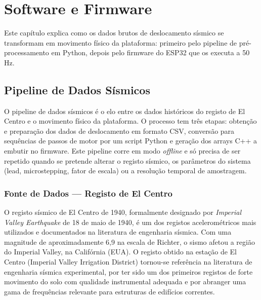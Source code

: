 

\chapter{Software e Firmware}
\label{chapter:software}

\begin{introduction}
Este capítulo explica como os dados brutos de deslocamento sísmico se transformam em movimento físico da plataforma: primeiro pelo pipeline de pré-processamento em Python, depois pelo firmware do ESP32 que os executa a 50\,Hz.
\end{introduction}



\section{Pipeline de Dados Sísmicos}
\label{sec:pipeline-dados}

O pipeline de dados sísmicos é o elo entre os dados históricos do registo de El Centro e o movimento físico da plataforma. O processo tem três etapas: obtenção e preparação dos dados de deslocamento em formato CSV, conversão para sequências de passos de motor por um script Python e geração dos arrays C++ a embutir no firmware. Este pipeline corre em modo \textit{offline} e só precisa de ser repetido quando se pretende alterar o registo sísmico, os parâmetros do sistema (lead, microstepping, fator de escala) ou a resolução temporal de amostragem.


\subsection{Fonte de Dados --- Registo de El Centro}
\label{subsec:fonte-dados}

O registo sísmico de El Centro de 1940, formalmente designado por \textit{Imperial Valley Earthquake} de 18 de maio de 1940, é um dos registos acelerométricos mais utilizados e documentados na literatura de engenharia sísmica. Com uma magnitude de aproximadamente 6,9 na escala de Richter, o sismo afetou a região do Imperial Valley, na Califórnia (EUA). O registo obtido na estação de El Centro (Imperial Valley Irrigation District) tornou-se referência na literatura de engenharia sísmica experimental, por ter sido um dos primeiros registos de forte movimento do solo com qualidade instrumental adequada e por abranger uma gama de frequências relevante para estruturas de edifícios correntes.

